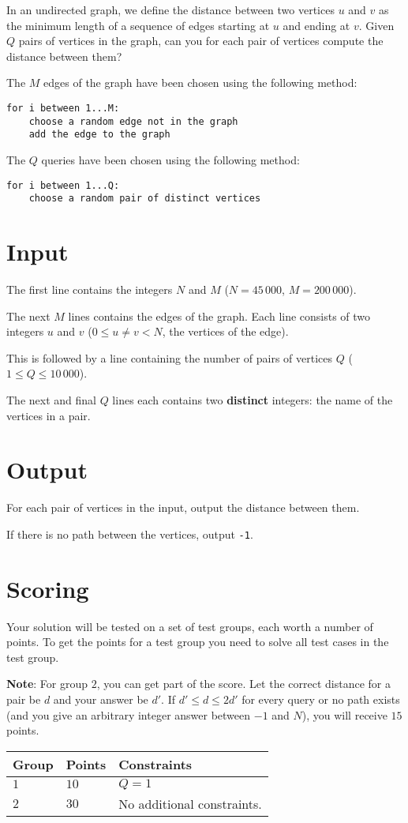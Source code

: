 In an undirected graph, we define the distance between two vertices $u$ and $v$ as the minimum length of a sequence of edges starting at $u$ and ending at $v$.
Given $Q$ pairs of vertices in the graph, can you for each pair of vertices compute the distance between them?

The $M$ edges of the graph have been chosen using the following method:
\begin{verbatim}
for i between 1...M:
    choose a random edge not in the graph
    add the edge to the graph
\end{verbatim}

The $Q$ queries have been chosen using the following method:
\begin{verbatim}
for i between 1...Q:
    choose a random pair of distinct vertices
\end{verbatim}

\section*{Input}
The first line contains the integers $N$ and $M$ ($N = 45\,000$, $M = 200\,000$). 

The next $M$ lines contains the edges of the graph.
Each line consists of two integers $u$ and $v$ ($0 \le u \neq v < N$, the vertices of the edge).

This is followed by a line containing the number of pairs of vertices $Q$ ($1 \le Q \le 10\,000$).

The next and final $Q$ lines each contains two \textbf{distinct} integers: the name of the vertices in a pair.

\section*{Output}
For each pair of vertices in the input, output the distance between them.

If there is no path between the vertices, output \texttt{-1}.

\section*{Scoring}
Your solution will be tested on a set of test groups, each worth a number of points.
To get the points for a test group you need to solve all test cases in the test group.

\textbf{Note}: For group $2$, you can get part of the score.
Let the correct distance for a pair be $d$ and your answer be $d'$.
If $d' \le d \le 2d'$ for every query or no path exists (and you give an arbitrary integer answer between $-1$ and $N$), you will receive $15$ points. 

\noindent
\begin{tabular}{| l | l | p{10cm} |}
  \hline
    \textbf{Group} & \textbf{Points} & \textbf{Constraints} \\ \hline
  $1$    & $10$        &  $Q = 1$ \\ \hline
  $2$    & $30$       & No additional constraints. \\ \hline
\end{tabular}
